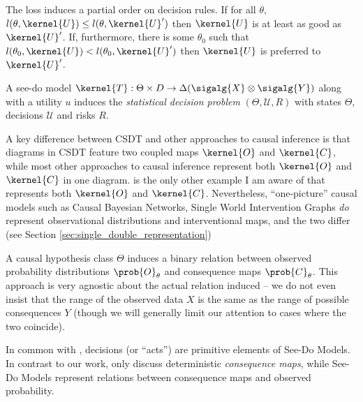 The loss induces a partial order on decision rules. If for all $\theta$, $l(\theta,\kernel{U})\leq l(\theta,\kernel{U}')$ then $\kernel{U}$ is at least as good as $\kernel{U}'$. If, furthermore, there is some $\theta_0$ such that $l(\theta_0,\kernel{U})<l(\theta_0,\kernel{U}')$ then $\kernel{U}$ is preferred to $\kernel{U}'$.

\begin{definition}
A see-do model $\kernel{T}:\Theta\times D\to \Delta(\sigalg{X}\otimes\sigalg{Y})$ along with a utility $u$ induces the \emph{statistical decision problem} $(\Theta,\mathscr{U},R)$ with states $\Theta$, decisions $\mathscr{U}$ and risks $R$.


\end{definition}




A key difference between CSDT and other approaches to causal inference is that diagrams in CSDT feature two coupled maps $\kernel{O}$ and $\kernel{C}$, while most other approaches to causal inference represent both $\kernel{O}$ and $\kernel{C}$ in one diagram. \citet{lattimore_replacing_2019} is the only other example I am aware of that represents both $\kernel{O}$ and $\kernel{C}$. Nevertheless, ``one-picture'' causal models such as Causal Bayesian Networks, Single World Intervention Graphs \emph{do} represent observational distributions and interventional maps, and the two differ (see Section \ref{sec:single_double_representation})

A causal hypothesis class $\Theta$ induces a binary relation between observed probability distributions $\prob{O}_\theta$ and consequence maps $\prob{C}_\theta$. This approach is very agnostic about the actual relation induced -- we do not even insist that the range of the observed data $X$ is the same as the range of possible consequences $Y$ (though we will generally limit our attention to cases where the two coincide). 

In common with \citet{heckerman_decision-theoretic_1995}, decisions (or ``acts'') are primitive elements of See-Do Models. In contrast to our work, \citet{heckerman_decision-theoretic_1995} only discuss deterministic \emph{consequence maps}, while See-Do Models represent relations between consequence maps and observed probability.

